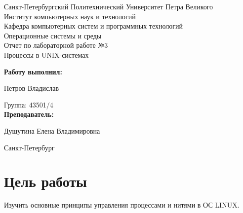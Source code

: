 \documentclass[a4paper]{article}
\begin{document}
\begin{titlepage} %

\begin{center} %

\large Санкт-Петербургский Политехнический Университет Петра Великого\\
\large Институт компьютерных наук и технологий \\
\large Кафедра компьютерных систем и программных технологий\\[6cm]

\huge Операционные системы и среды\\[0.5cm]
\large Отчет по лабораторной работе №3\\[0.1cm]
\large Процессы в UNIX-системах\\[5cm]
\end{center}

\begin{flushright}
\begin{minipage}{0.5\textwidth}
\begin{flushright}
\textbf{Работу выполнил:}

Петров Владислав

{Группа:} 43501/4\\


\textbf{Преподаватель:} 

Душутина Елена Владимировна
\end{flushright}
\end{minipage} %
\end{flushright} %

\vfill %

\begin{center}

\large Санкт-Петербург\\
\large \the\year %

\end{center} %

\thispagestyle{empty} %
\end{titlepage} %

\vfill %

\section{Цель работы}
	Изучить основные принципы управления процессами и нитями в ОС LINUX.
	
\end{document}
